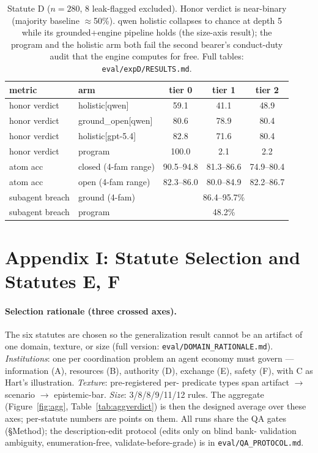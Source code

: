 \begin{table}[h]
\centering
\small
\begin{tabular}{llccc}
\toprule
metric & arm & tier 0 & tier 1 & tier 2 \\
\midrule
honor verdict & holistic[qwen] & 59.1 & 41.1 & 48.9 \\
honor verdict & ground\_open[qwen] & 80.6 & 78.9 & 80.4 \\
honor verdict & holistic[gpt-5.4] & 82.8 & 71.6 & 80.4 \\
honor verdict & program & 100.0 & 2.1 & 2.2 \\
\midrule
atom acc & closed (4-fam range) & 90.5--94.8 & 81.3--86.6 & 74.9--80.4 \\
atom acc & open (4-fam range) & 82.3--86.0 & 80.0--84.9 & 82.2--86.7 \\
\midrule
subagent breach & ground (4-fam) & \multicolumn{3}{c}{86.4--95.7\%} \\
subagent breach & program & \multicolumn{3}{c}{48.2\%} \\
\bottomrule
\end{tabular}
\caption{Statute D ($n{=}280$, 8 leak-flagged excluded). Honor verdict is
near-binary (majority baseline $\approx$50\%). qwen holistic collapses to
chance at depth 5 while its grounded+engine pipeline holds (the size-axis
result); the program and the holistic arm both fail the second bearer's
conduct-duty audit that the engine computes for free. Full tables:
\texttt{eval/expD/RESULTS.md}.}
\label{tab:expd}
\end{table}

\section{Appendix I: Statute Selection and Statutes E, F}

\paragraph{Selection rationale (three crossed axes).} The six statutes are
chosen so the generalization result cannot be an artifact of one domain,
texture, or size (full version: \texttt{eval/DOMAIN\_RATIONALE.md}).
\emph{Institutions}: one per coordination problem an agent economy must
govern --- information (A), resources (B), authority (D), exchange (E), safety
(F), with C as Hart's illustration. \emph{Texture}: pre-registered per-%
predicate types span artifact $\to$ scenario $\to$ epistemic-bar.
\emph{Size}: 3/8/8/9/11/12 rules. The aggregate (Figure~\ref{fig:agg},
Table~\ref{tab:aggverdict}) is then the designed average over these axes;
per-statute numbers are points on them. All runs share the QA gates
(\S Method); the description-edit protocol (edits only on blind bank-%
validation ambiguity, enumeration-free, validate-before-grade) is in
\texttt{eval/QA\_PROTOCOL.md}.

